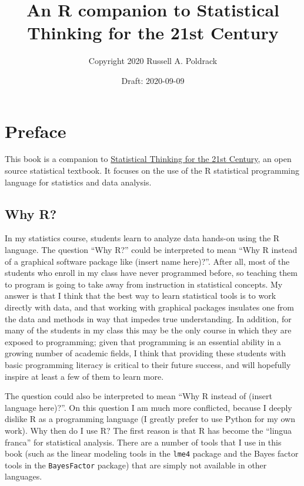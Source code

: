 \documentclass[12pt,]{book}
\title{An R companion to Statistical Thinking for the 21st Century}
\author{Copyright 2020 Russell A. Poldrack}
\date{Draft: 2020-09-09}
\begin{document}
\maketitle

{
\setcounter{tocdepth}{1}
\tableofcontents
}
\hypertarget{preface}{%
\chapter*{Preface}\label{preface}}

This book is a companion to \href{https://statsthinking21.org/}{Statistical Thinking for the 21st Century}, an open source statistical textbook. It focuses on the use of the R statistical programming language for statistics and data analysis.

\hypertarget{why-r}{%
\section{Why R?}\label{why-r}}

In my statistics course, students learn to analyze data hands-on using the R language. The question ``Why R?'' could be interpreted to mean ``Why R instead of a graphical software package like (insert name here)?''. After all, most of the students who enroll in my class have never programmed before, so teaching them to program is going to take away from instruction in statistical concepts. My answer is that I think that the best way to learn statistical tools is to work directly with data, and that working with graphical packages insulates one from the data and methods in way that impedes true understanding. In addition, for many of the students in my class this may be the only course in which they are exposed to programming; given that programming is an essential ability in a growing number of academic fields, I think that providing these students with basic programming literacy is critical to their future success, and will hopefully inspire at least a few of them to learn more.

The question could also be interpreted to mean ``Why R instead of (insert language here)?''. On this question I am much more conflicted, because I deeply dislike R as a programming language (I greatly prefer to use Python for my own work). Why then do I use R? The first reason is that R has become the ``lingua franca'' for statistical analysis. There are a number of tools that I use in this book (such as the linear modeling tools in the \texttt{lme4} package and the Bayes factor tools in the \texttt{BayesFactor} package) that are simply not available in other languages.
\end{document}
